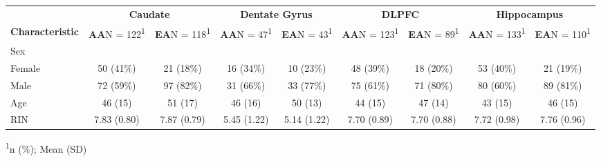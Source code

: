 \captionsetup[table]{labelformat=empty,skip=1pt}
\setlength{\LTpost}{0mm}
\begin{longtable}{lcccccccc}
\toprule
 & \multicolumn{2}{c}{\textbf{Caudate}} & \multicolumn{2}{c}{\textbf{Dentate Gyrus}} & \multicolumn{2}{c}{\textbf{DLPFC}} & \multicolumn{2}{c}{\textbf{Hippocampus}} \\ 
\cmidrule(lr){2-3} \cmidrule(lr){4-5} \cmidrule(lr){6-7} \cmidrule(lr){8-9}
\textbf{Characteristic} & \textbf{AA}N = 122\textsuperscript{1} & \textbf{EA}N = 118\textsuperscript{1} & \textbf{AA}N = 47\textsuperscript{1} & \textbf{EA}N = 43\textsuperscript{1} & \textbf{AA}N = 123\textsuperscript{1} & \textbf{EA}N = 89\textsuperscript{1} & \textbf{AA}N = 133\textsuperscript{1} & \textbf{EA}N = 110\textsuperscript{1} \\ 
\midrule
Sex &  &  &  &  &  &  &  &  \\ 
Female & 50 (41\%) & 21 (18\%) & 16 (34\%) & 10 (23\%) & 48 (39\%) & 18 (20\%) & 53 (40\%) & 21 (19\%) \\ 
Male & 72 (59\%) & 97 (82\%) & 31 (66\%) & 33 (77\%) & 75 (61\%) & 71 (80\%) & 80 (60\%) & 89 (81\%) \\ 
Age & 46 (15) & 51 (17) & 46 (16) & 50 (13) & 44 (15) & 47 (14) & 43 (15) & 46 (15) \\ 
RIN & 7.83 (0.80) & 7.87 (0.79) & 5.45 (1.22) & 5.14 (1.22) & 7.70 (0.89) & 7.70 (0.88) & 7.72 (0.98) & 7.76 (0.96) \\ 
\bottomrule
\end{longtable}
\begin{minipage}{\linewidth}
\textsuperscript{1}n (\%); Mean (SD)\\
\end{minipage}

